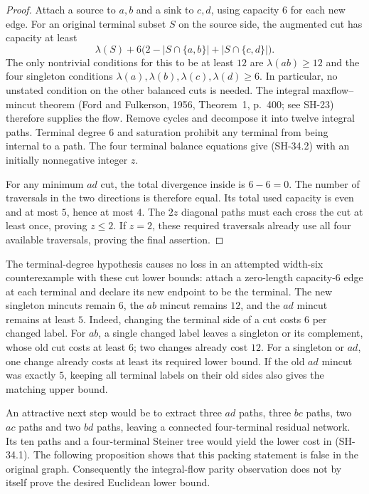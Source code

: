 \begin{proof}
Attach a source to $a,b$ and a sink to $c,d$, using capacity
$6$ for each new edge.  For an original terminal subset $S$
on the source side, the augmented cut has capacity at least
\[
 \lambda(S)+6\bigl(2-|S\cap\{a,b\}|
                         +|S\cap\{c,d\}|\bigr).
\]
The only nontrivial conditions for this to be at least $12$
are $\lambda(ab)\ge12$ and the four singleton conditions
$\lambda(a),\lambda(b),\lambda(c),\lambda(d)\ge6$.
In particular, no unstated condition on the other balanced
cuts is needed.  The integral maxflow--mincut theorem
(Ford and Fulkerson, 1956, Theorem~1, p.~400; see SH-23)
therefore supplies the flow.  Remove cycles and decompose
it into twelve integral paths.  Terminal degree $6$ and
saturation prohibit any terminal from being internal to
a path.  The four terminal balance equations give (SH-34.2)
with an initially nonnegative integer $z$.

For any minimum $ad$ cut, the total divergence inside is
$6-6=0$.  The number of traversals in the two directions is
therefore equal.  Its total used capacity is even and at
most $5$, hence at most $4$.  The $2z$ diagonal paths must
each cross the cut at least once, proving $z\le2$.  If
$z=2$, these required traversals already use all four
available traversals, proving the final assertion.
\end{proof}

The terminal-degree hypothesis causes no loss in an attempted
width-six counterexample with these cut lower bounds: attach
a zero-length capacity-$6$ edge at each terminal and declare
its new endpoint to be the terminal.  The new singleton
mincuts remain $6$, the $ab$ mincut remains $12$, and the
$ad$ mincut remains at least $5$.  Indeed, changing the
terminal side of a cut costs $6$ per changed label.  For
$ab$, a single changed label leaves a singleton or its
complement, whose old cut costs at least $6$; two changes
already cost $12$.  For a singleton or $ad$, one change
already costs at least its required lower bound.  If the
old $ad$ mincut was exactly $5$, keeping all terminal labels
on their old sides also gives the matching upper bound.

An attractive next step would be to extract three $ad$ paths,
three $bc$ paths, two $ac$ paths and two $bd$ paths, leaving
a connected four-terminal residual network.  Its ten paths
and a four-terminal Steiner tree would yield the lower cost
in (SH-34.1).  The following proposition shows that this
packing statement is false in the original graph.  Consequently
the integral-flow parity observation does not by itself prove
the desired Euclidean lower bound.

